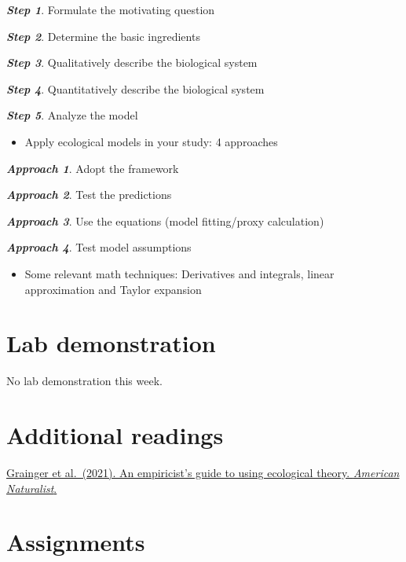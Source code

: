 \documentclass[
]{book}
\providecommand{\tightlist}{%
  \setlength{\itemsep}{0pt}\setlength{\parskip}{0pt}}
\begin{document}
{\textbf{\emph{Step 1}}. Formulate the motivating question}

{\textbf{\emph{Step 2}}. Determine the basic ingredients}

{\textbf{\emph{Step 3}}. Qualitatively describe the biological system}

{\textbf{\emph{Step 4}}. Quantitatively describe the biological system}

{\textbf{\emph{Step 5}}. Analyze the model}

\begin{itemize}
\tightlist
\item
  Apply ecological models in your study: 4 approaches
\end{itemize}

{\textbf{\emph{Approach 1}}. Adopt the framework}

{\textbf{\emph{Approach 2}}. Test the predictions}

{\textbf{\emph{Approach 3}}. Use the equations (model fitting/proxy calculation)}

{\textbf{\emph{Approach 4}}. Test model assumptions}

\begin{itemize}
\tightlist
\item
  Some relevant math techniques: Derivatives and integrals, linear approximation and Taylor expansion
\end{itemize}

\hypertarget{lab-demonstration}{%
\section*{Lab demonstration}\label{lab-demonstration}}

No lab demonstration this week.

\hypertarget{additional-readings}{%
\section*{Additional readings}\label{additional-readings}}

\href{./Additional\%20readings/Grainger_et_al_2021_AmNat.pdf}{Grainger et al.~(2021). An empiricist's guide to using ecological theory. \emph{American Naturalist}.}

\hypertarget{assignments}{%
\section*{Assignments}\label{assignments}}
\end{document}
